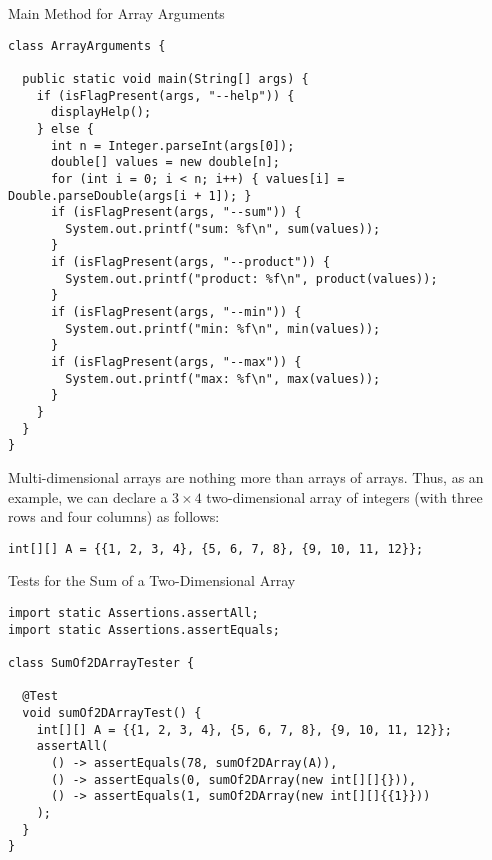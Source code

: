\begin{cl}{Main Method for Array Arguments}
\begin{lstlisting}[language=MyJava]
class ArrayArguments {

  public static void main(String[] args) {
    if (isFlagPresent(args, "--help")) {
      displayHelp();
    } else {
      int n = Integer.parseInt(args[0]);
      double[] values = new double[n];
      for (int i = 0; i < n; i++) { values[i] = Double.parseDouble(args[i + 1]); }
      if (isFlagPresent(args, "--sum")) { 
        System.out.printf("sum: %f\n", sum(values)); 
      }
      if (isFlagPresent(args, "--product")) { 
        System.out.printf("product: %f\n", product(values)); 
      }
      if (isFlagPresent(args, "--min")) { 
        System.out.printf("min: %f\n", min(values)); 
      }
      if (isFlagPresent(args, "--max")) { 
        System.out.printf("max: %f\n", max(values)); 
      }
    }
  }
}
\end{lstlisting}
\end{cl}


Multi-dimensional arrays are nothing more than arrays of arrays. Thus, as an example, we can declare a $3 \times 4$ two-dimensional array of integers (with three rows and four columns) as follows:
\par{
\begin{verbatim}
int[][] A = {{1, 2, 3, 4}, {5, 6, 7, 8}, {9, 10, 11, 12}};
\end{verbatim}
}

\begin{cl}{Tests for the Sum of a Two-Dimensional Array}
\begin{lstlisting}[language=MyJava]
import static Assertions.assertAll;
import static Assertions.assertEquals;

class SumOf2DArrayTester {

  @Test
  void sumOf2DArrayTest() {
    int[][] A = {{1, 2, 3, 4}, {5, 6, 7, 8}, {9, 10, 11, 12}};
    assertAll(
      () -> assertEquals(78, sumOf2DArray(A)),
      () -> assertEquals(0, sumOf2DArray(new int[][]{})),
      () -> assertEquals(1, sumOf2DArray(new int[][]{{1}}))
    );
  }
}
\end{lstlisting}
\end{cl}

